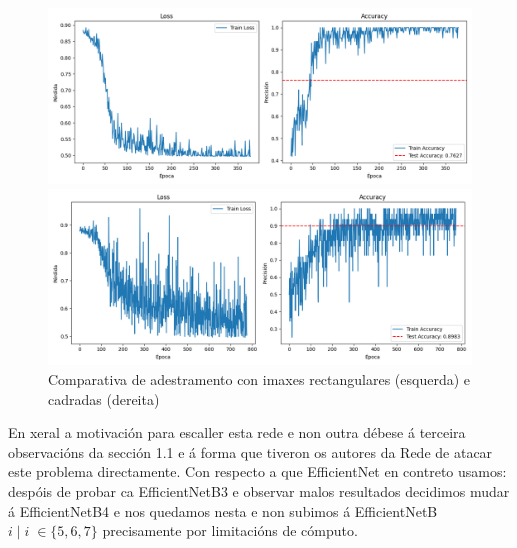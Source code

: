 \documentclass{article}
\begin{document}
\begin{itemize}
\begin{figure}[h]
	\centering
	\begin{minipage}{0.45\textwidth}
		\centering
		\includegraphics[width=\linewidth]{rectangulo.png}
	\end{minipage}
	\hfill
	\begin{minipage}{0.45\textwidth}
		\centering
		\includegraphics[width=\linewidth]{cadrado.png}
	\end{minipage}
	\label{fig:comparativa}
	\caption{Comparativa de adestramento con imaxes rectangulares (esquerda) e cadradas (dereita)}
\end{figure}




En xeral a motivación para escaller esta rede e non outra débese á terceira observacións da sección 1.1 e á forma que tiveron os autores da Rede de atacar este problema directamente. Con respecto a que EfficientNet en contreto usamos: despóis de probar ca EfficientNetB3 e observar malos resultados decidimos mudar á EfficientNetB4 e nos quedamos nesta e non subimos á EfficientNetB$i \; |\; i\; \in \{5,6,7\}$ precisamente por limitacións de cómputo.


\end{itemize}
\end{document}
